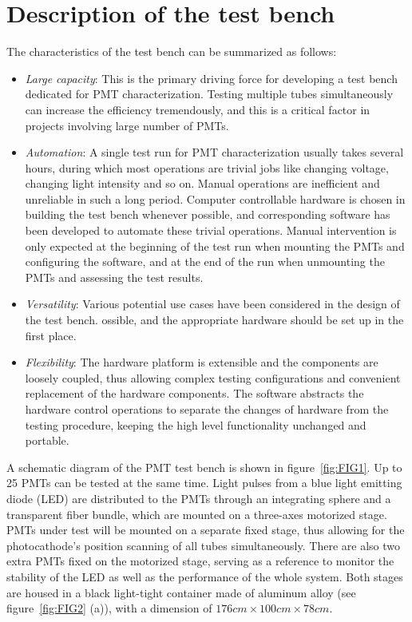 \documentclass{JINST}
\begin{document}
\section{Description of the test bench}
\label{sec:description}

The characteristics of the test bench can be summarized as follows:
\begin{itemize}
	\item \textit{Large capacity}: This is the primary driving force for developing a test bench dedicated for PMT characterization.
	Testing multiple tubes simultaneously can increase the efficiency tremendously, and this is a critical factor in projects involving large number of PMTs. 
	\item \textit{Automation}: A single test run for PMT characterization usually takes several hours, during which most operations are trivial jobs like changing voltage, changing light intensity and so on.
	Manual operations are inefficient and unreliable in such a long period.
	Computer controllable hardware is chosen in building the test bench whenever possible, and corresponding software has been developed to automate these trivial operations.
	Manual intervention is only expected at the beginning of the test run when mounting the PMTs and configuring the software, and at the end of the run when unmounting the PMTs and assessing the test results.
	\item \textit{Versatility}: Various potential use cases have been considered in the design of the test bench.
	ossible, and the appropriate hardware should be set up in the first place.
	\item \textit{Flexibility}: %
	The hardware platform is extensible and the components are loosely coupled, thus allowing complex testing configurations and convenient replacement of the hardware components.
	The software abstracts the hardware control operations to separate the changes of hardware from the testing procedure, keeping the high level functionality unchanged and portable. 
\end{itemize}

A schematic diagram of the PMT test bench is shown in figure~\ref{fig:FIG1}.
Up to 25 PMTs can be tested at the same time.
Light pulses from a blue light emitting diode (LED) are distributed to the PMTs through an integrating sphere and a transparent fiber bundle, which are mounted on a three-axes motorized stage.
PMTs under test will be mounted on a separate fixed stage, thus allowing for the photocathode's position scanning of all tubes simultaneously.
There are also two extra PMTs fixed on the motorized stage, serving as a reference to monitor the stability of the LED as well as the performance of the whole system.
Both stages are housed in a black light-tight container made of aluminum alloy (see figure~\ref{fig:FIG2} (a)), with a dimension of $176cm\times100cm\times78cm$.
\end{document}
